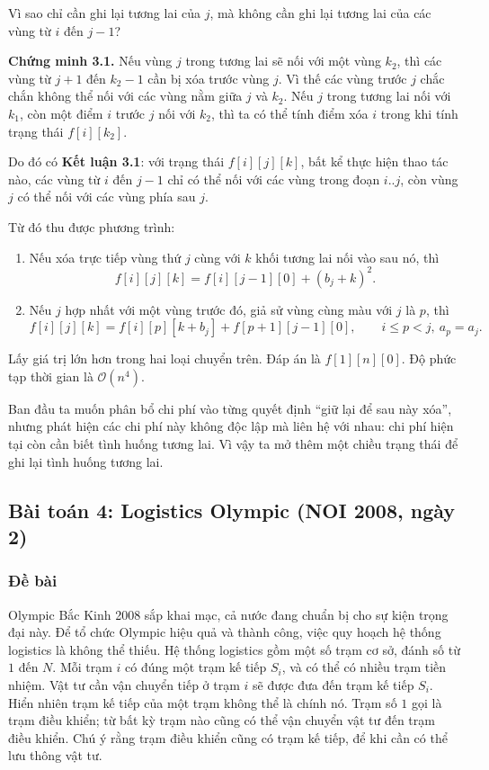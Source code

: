 \documentclass[11pt]{article}
\newcommand{\Oh}{\mathcal{O}}
\begin{document}
Vì sao chỉ cần ghi lại tương lai của $j$, mà không cần ghi lại tương lai của
các vùng từ $i$ đến $j-1$?

\noindent\textbf{Chứng minh 3.1.} Nếu vùng $j$ trong tương lai sẽ nối với một
vùng $k_2$, thì các vùng từ $j+1$ đến $k_2-1$ cần bị xóa trước vùng $j$. Vì
thế các vùng trước $j$ chắc chắn không thể nối với các vùng nằm giữa $j$ và
$k_2$. Nếu $j$ trong tương lai nối với $k_1$, còn một điểm $i$ trước $j$ nối
với $k_2$, thì ta có thể tính điểm xóa $i$ trong khi tính trạng thái
$f[i][k_2]$.

Do đó có \textbf{Kết luận 3.1}: với trạng thái $f[i][j][k]$, bất kể thực hiện
thao tác nào, các vùng từ $i$ đến $j-1$ chỉ có thể nối với các vùng trong
đoạn $i..j$, còn vùng $j$ có thể nối với các vùng phía sau $j$.

Từ đó thu được phương trình:
\begin{enumerate}
  \item Nếu xóa trực tiếp vùng thứ $j$ cùng với $k$ khối tương lai nối vào
  sau nó, thì
  \[
    f[i][j][k]=f[i][j-1][0]+(b_j+k)^2.
  \]
  \item Nếu $j$ hợp nhất với một vùng trước đó, giả sử vùng cùng màu với $j$
  là $p$, thì
  \[
    f[i][j][k]=f[i][p][k+b_j]+f[p+1][j-1][0],
    \qquad i\le p<j,\ a_p=a_j.
  \]
\end{enumerate}
Lấy giá trị lớn hơn trong hai loại chuyển trên. Đáp án là $f[1][n][0]$.
Độ phức tạp thời gian là $\Oh(n^4)$.

Ban đầu ta muốn phân bổ chi phí vào từng quyết định ``giữ lại để sau này
xóa'', nhưng phát hiện các chi phí này không độc lập mà liên hệ với nhau:
chi phí hiện tại còn cần biết tình huống tương lai. Vì vậy ta mở thêm một
chiều trạng thái để ghi lại tình huống tương lai.

\subsection{Bài toán 4: Logistics Olympic (NOI 2008, ngày 2)}

\subsubsection*{Đề bài}

Olympic Bắc Kinh 2008 sắp khai mạc, cả nước đang chuẩn bị cho sự kiện trọng
đại này. Để tổ chức Olympic hiệu quả và thành công, việc quy hoạch hệ thống
logistics là không thể thiếu. Hệ thống logistics gồm một số trạm cơ sở, đánh
số từ $1$ đến $N$. Mỗi trạm $i$ có đúng một trạm kế tiếp $S_i$, và có thể có
nhiều trạm tiền nhiệm. Vật tư cần vận chuyển tiếp ở trạm $i$ sẽ được đưa đến
trạm kế tiếp $S_i$. Hiển nhiên trạm kế tiếp của một trạm không thể là chính
nó. Trạm số $1$ gọi là trạm điều khiển; từ bất kỳ trạm nào cũng có thể vận
chuyển vật tư đến trạm điều khiển. Chú ý rằng trạm điều khiển cũng có trạm kế
tiếp, để khi cần có thể lưu thông vật tư.
\end{document}
